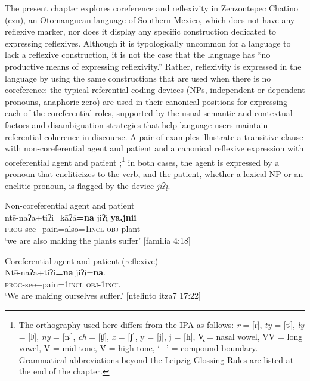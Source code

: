 \documentclass[output=paper]{../langscibook}
\begin{document}
The present chapter explores coreference and reflexivity in Zenzontepec Chatino (czn), an Otomanguean language of Southern Mexico, which does not have any reflexive marker, nor does it display any specific construction dedicated to expressing reflexives. Although it is typologically uncommon for a language to lack a reflexive construction, it is not the case that the language has “no productive means of expressing reflexivity.” Rather, reflexivity is expressed in the language by using the same constructions that are used when there is no coreference: the typical referential coding devices (NPs, independent or dependent pronouns, anaphoric zero) are used in their canonical positions for expressing each of the coreferential roles, supported by the usual semantic and contextual factors and disambiguation strategies that help language users maintain referential coherence in discourse. A pair of examples illustrate a transitive clause with non-coreferential agent and patient  and a canonical reflexive expression with coreferential agent and patient ;\footnote{The orthography used here differs from the IPA as follows: \textit{r}  = [ɾ], \textit{ty} = [tʲ], \textit{ly} = [lʲ], \textit{ny}  = [nʲ], \textit{ch} = [ʧ], \textit{x} = [ʃ], y = [j], j = [h], V̨ = nasal vowel, VV = long vowel, \={V} = mid tone, \'{V} = high tone, ‘+’ = compound boundary. Grammatical abbreviations beyond the Leipzig Glossing Rules are listed at the end of the chapter.} in both cases, the agent is expressed by a pronoun that encliticizes to the verb, and the patient, whether a lexical NP or an enclitic pronoun, is flagged by the device \textit{jiʔį}.


\ea\label{ex:campbell:1}
\ea
\label{ex:campbell:1a}
Non-coreferential agent and patient\\
\gll ntē-naʔa+tiʔi=kāʔá\textbf{=na}  jiʔį  \textbf{ya.jnii}\\
     \textsc{prog}{}-see+pain=also=\textsc{1incl}  \textsc{obj}  plant\\
\glt ‘we are also making the plants suffer’ [familia 4:18]

\ex\label{ex:campbell:1b}
{Coreferential agent and patient (reflexive)}\\
\gll Ntē-naʔa+tiʔi\textbf{=na}  jiʔį=\textbf{na}.\\
     \textsc{prog}{}-see+pain=\textsc{1incl}  \textsc{obj}{}-\textsc{1incl}\\
\glt ‘We are making ourselves suffer.’ [ntelinto itza7 17:22]
\z
\z
\end{document}
